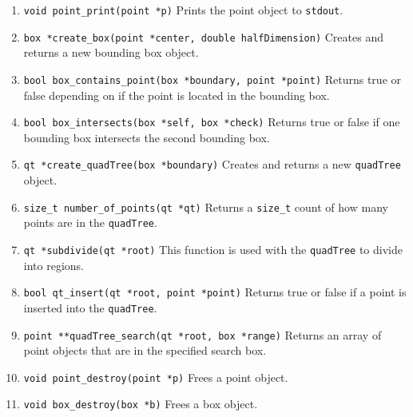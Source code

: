 \documentclass[12pt]{article}
\begin{document}
{{{\begin{enumerate}
\item \lstinline|void point_print(point *p)|
\newline
Prints the point object to \lstinline|stdout|.

\item \lstinline|box *create_box(point *center, double halfDimension)|
\newline
Creates and returns a new bounding box object.

\item \lstinline|bool box_contains_point(box *boundary, point *point)|
\newline
Returns true or false depending on if the point is located in the bounding box.

\item \lstinline|bool box_intersects(box *self, box *check)|
\newline
Returns true or false if one bounding box intersects the second bounding box.

\item \lstinline|qt *create_quadTree(box *boundary)|
\newline
Creates and returns a new \lstinline|quadTree| object.

\item \lstinline|size_t number_of_points(qt *qt)|
\newline
Returns a \lstinline|size_t| count of how many points are in the \lstinline|quadTree|.

\item \lstinline|qt *subdivide(qt *root)|
\newline
This function is used with the \lstinline|quadTree| to divide into regions.

\item \lstinline|bool qt_insert(qt *root, point *point)|
\newline
Returns true or false if a point is inserted into the \lstinline|quadTree|.

\item \lstinline|point **quadTree_search(qt *root, box *range)|
\newline
Returns an array of point objects that are in the specified search box.

\item \lstinline|void point_destroy(point *p)|
\newline
Frees a point object.

\item \lstinline|void box_destroy(box *b)|
\newline
Frees a box object.


\end{enumerate}}}}
\end{document}
